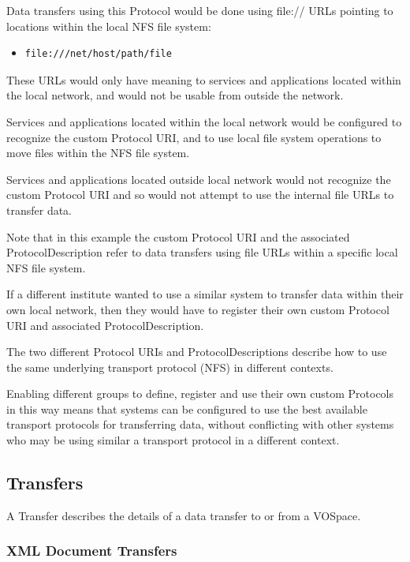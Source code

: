 \documentclass[11pt,a4paper]{ivoa}
\begin{document}
Data transfers using this Protocol would be done using file:// URLs pointing to locations within the local NFS file system:

\begin{itemize}
    \item \begin{verbatim}file:///net/host/path/file\end{verbatim}
\end{itemize}

These URLs would only have meaning to services and applications located within the local network, and would not be usable from outside the network.

Services and applications located within the local network would be configured to recognize the custom Protocol URI, and to use local file system operations to move files within the NFS file system.

Services and applications located outside local network would not recognize the custom Protocol URI and so would not attempt to use the internal file URLs to transfer data.

Note that in this example the custom Protocol URI and the associated ProtocolDescription refer to data transfers using file URLs within a specific local NFS file system.

If a different institute wanted to use a similar system to transfer data within their own local network, then they would have to register their own custom Protocol URI and associated ProtocolDescription.

The two different Protocol URIs and ProtocolDescriptions describe how to use the same underlying transport protocol (NFS) in different contexts.

Enabling different groups to define, register and use their own custom Protocols in this way means that systems can be configured to use the best available transport protocols for transferring data, without conflicting with other systems who may be using similar a transport protocol in a different context.

\subsection{Transfers}
\label{subsec:transfers}
A Transfer describes the details of a data transfer to or from a VOSpace.

\subsubsection{XML Document Transfers}
\label{subsubsec:xml document transfers}
\end{document}
